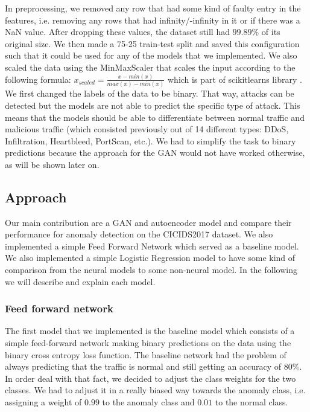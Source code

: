 \documentclass[]{article}
\begin{document}
	 
	 \noindent
	 In preprocessing, we removed any row that had some kind of faulty entry in the features, i.e. removing any rows that had infinity/-infinity in it or if there was a NaN value. After dropping these values, the dataset still had $99.89\%$ of its original size. We then made a 75-25 train-test split and saved this configuration such that it could be used for any of the models that we implemented. We also scaled the data using the MinMaxScaler that scales the input according to the following formula: $x_{scaled} = \frac{x-min(x)}{max(x)-min(x)}$ which is part of scikitlearns library \cite{sklearn_api}. We first changed the labels of the data to be binary. That way, attacks can be detected but the models are not able to predict the specific type of attack. This means that the models should be able to differentiate between normal traffic and malicious traffic (which consisted previously out of 14 different types: DDoS, Infiltration, Heartbleed, PortScan, etc.). We had to simplify the task to binary predictions because the approach for the GAN would not have worked otherwise, as will be shown later on. 

	 \subsection{Approach}

	 Our main contribution are a GAN and autoencoder model and compare their performance for anomaly detection on the CICIDS2017 dataset. We also implemented  a simple Feed Forward Network which served as a baseline model. We also implemented a simple Logistic Regression model to have some kind of comparison from the neural models to some non-neural model. In the following we will describe and explain each model.

	 
		
	  \subsubsection{Feed forward network}
	 The first model that we implemented is the baseline model which consists of a simple feed-forward network making binary predictions on the data using the binary cross entropy loss function. The baseline network had the problem of always predicting that the traffic is normal and still getting an accuracy of $80\%$. In order deal with that fact, we decided to adjust the class weights for the two classes. We had to adjust it in a really biased way towards the anomaly class, i.e. assigning a weight of $0.99$ to the anomaly class and $0.01$ to the normal class. 
\end{document}
